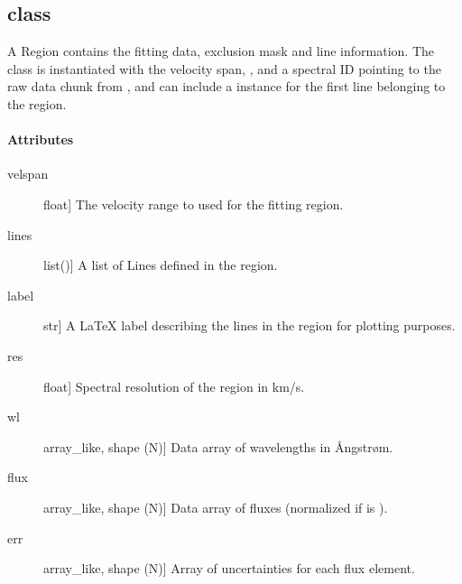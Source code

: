 \documentclass[letterpaper,10pt,english]{sphinxmanual}
\begin{document}
\subsection{class }
\label{\detokenize{api:class-region}}

\begin{fulllineitems}
\label{\detokenize{api:regions.Region}}
A Region contains the fitting data, exclusion mask and line information.
The class is instantiated with the velocity span, , and a spectral ID
pointing to the raw data chunk from ,
and can include a {\hyperref[\detokenize{api:dataset.Line}]{}} instance for the first line
belonging to the region.
\paragraph{Attributes}
\begin{description}
\item[{velspan}] \leavevmode{[}float{]}
The velocity range to used for the fitting region.

\item[{lines}] \leavevmode{[}list({\hyperref[\detokenize{api:dataset.Line}]{}}){]}
A list of Lines defined in the region.

\item[{label}] \leavevmode{[}str{]}
A LaTeX label describing the lines in the region for plotting purposes.

\item[{res}] \leavevmode{[}float{]}
Spectral resolution of the region in km/s.

\item[{wl}] \leavevmode{[}array\_like, shape (N){]}
Data array of wavelengths in Ångstrøm.

\item[{flux}] \leavevmode{[}array\_like, shape (N){]}
Data array of fluxes (normalized if  is ).

\item[{err}] \leavevmode{[}array\_like, shape (N){]}
Array of uncertainties for each flux element.


\end{description}
\end{fulllineitems}
\end{document}
